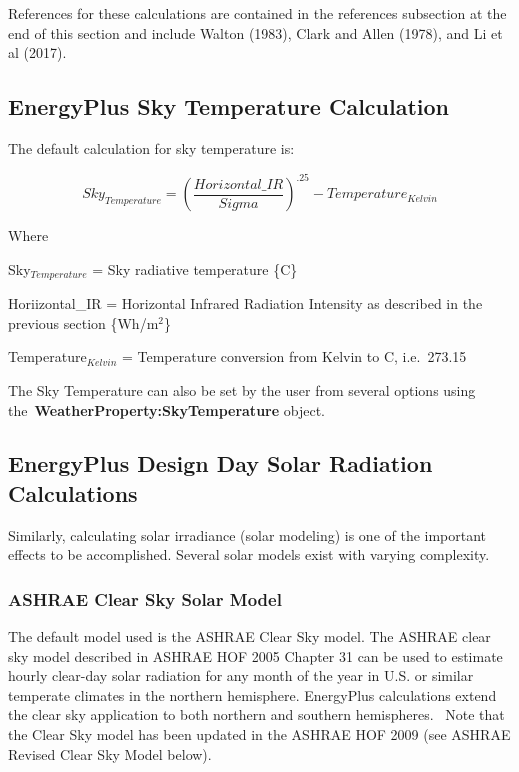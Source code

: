 References for these calculations are contained in the references subsection at the end of this section and include Walton (1983), Clark and Allen (1978), and Li et al (2017).

\subsection{EnergyPlus Sky Temperature Calculation}\label{energyplus-sky-temperature-calculation}

The default calculation for sky temperature is:

\begin{equation}
Sk{y_{Temperature}} = {\left( {\frac{{Horizontal\_IR}}{{Sigma}}} \right)^{.25}} - Temperatur{e_{Kelvin}}
\end{equation}

Where

Sky\(_{Temperature}\) = Sky radiative temperature \{C\}

Horiizontal\_IR = Horizontal Infrared Radiation Intensity as described in the previous section \{Wh/m\(^{2}\)\}

Temperature\(_{Kelvin}\) = Temperature conversion from Kelvin to C, i.e.~273.15

The Sky Temperature can also be set by the user from several options using the~\textbf{WeatherProperty:SkyTemperature} object.

\subsection{EnergyPlus Design Day Solar Radiation Calculations}\label{energyplus-design-day-solar-radiation-calculations}

Similarly, calculating solar irradiance (solar modeling) is one of the important effects to be accomplished. Several solar models exist with varying complexity.

\subsubsection{ASHRAE Clear Sky Solar Model}\label{ashrae-clear-sky-solar-model}

The default model used is the ASHRAE Clear Sky model. The ASHRAE clear sky model described in ASHRAE HOF 2005 Chapter 31 can be used to estimate hourly clear-day solar radiation for any month of the year in U.S. or similar temperate climates in the northern hemisphere. EnergyPlus calculations extend the clear sky application to both northern and southern hemispheres.~ Note that the Clear Sky model has been updated in the ASHRAE HOF 2009 (see ASHRAE Revised Clear Sky Model below).

